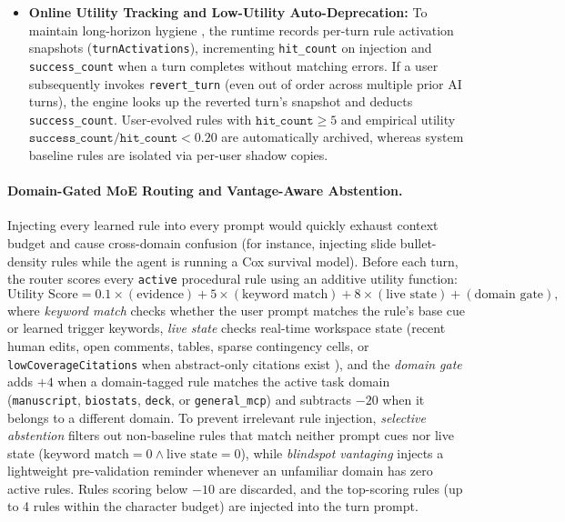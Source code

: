 \documentclass[11pt,a4paper]{article}
\begin{document}
\begin{itemize}[leftmargin=1.5em,itemsep=2pt]
  \item \textbf{Online Utility Tracking and Low-Utility Auto-Deprecation:} To maintain long-horizon hygiene \cite{msce2026}, the runtime records per-turn rule activation snapshots (\texttt{turnActivations}), incrementing \texttt{hit\_count} on injection and \texttt{success\_count} when a turn completes without matching errors. If a user subsequently invokes \texttt{revert\_turn} (even out of order across multiple prior AI turns), the engine looks up the reverted turn's snapshot and deducts \texttt{success\_count}. User-evolved rules with $\texttt{hit\_count} \ge 5$ and empirical utility $\texttt{success\_count}/\texttt{hit\_count} < 0.20$ are automatically archived, whereas system baseline rules are isolated via per-user shadow copies.
\end{itemize}

\paragraph{Domain-Gated MoE Routing and Vantage-Aware Abstention.}
Injecting every learned rule into every prompt would quickly exhaust context budget and cause cross-domain confusion (for instance, injecting slide bullet-density rules while the agent is running a Cox survival model). Before each turn, the router scores every \texttt{active} procedural rule using an additive utility function:
\[
  \text{Utility Score} = 0.1 \times (\text{evidence}) + 5 \times (\text{keyword match}) + 8 \times (\text{live state}) + (\text{domain gate}),
\]
where \emph{keyword match} checks whether the user prompt matches the rule's base cue or learned trigger keywords, \emph{live state} checks real-time workspace state (recent human edits, open comments, tables, sparse contingency cells, or \texttt{lowCoverageCitations} when abstract-only citations exist \cite{safevantage2026}), and the \emph{domain gate} adds $+4$ when a domain-tagged rule matches the active task domain (\texttt{manuscript}, \texttt{biostats}, \texttt{deck}, or \texttt{general\_mcp}) and subtracts $-20$ when it belongs to a different domain. To prevent irrelevant rule injection, \emph{selective abstention} filters out non-baseline rules that match neither prompt cues nor live state ($\text{keyword match} = 0 \land \text{live state} = 0$), while \emph{blindspot vantaging} injects a lightweight pre-validation reminder whenever an unfamiliar domain has zero active rules. Rules scoring below $-10$ are discarded, and the top-scoring rules (up to 4 rules within the character budget) are injected into the turn prompt.
\end{document}
